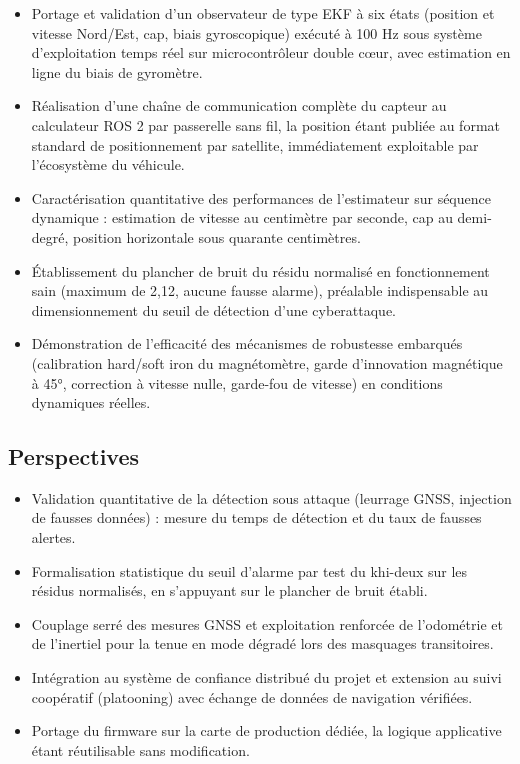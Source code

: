 \documentclass[11pt,a4paper]{article}
\begin{document}
\begin{itemize}
\item Portage et validation d’un observateur de type EKF à six états (position et vitesse Nord/Est, cap, biais gyroscopique) exécuté à 100 Hz sous système d’exploitation temps réel sur microcontrôleur double cœur, avec estimation en ligne du biais de gyromètre.
\item Réalisation d’une chaîne de communication complète du capteur au calculateur ROS 2 par passerelle sans fil, la position étant publiée au format standard de positionnement par satellite, immédiatement exploitable par l’écosystème du véhicule.
\item Caractérisation quantitative des performances de l’estimateur sur séquence dynamique : estimation de vitesse au centimètre par seconde, cap au demi-degré, position horizontale sous quarante centimètres.
\item Établissement du plancher de bruit du résidu normalisé en fonctionnement sain (maximum de 2,12, aucune fausse alarme), préalable indispensable au dimensionnement du seuil de détection d’une cyberattaque.
\item Démonstration de l’efficacité des mécanismes de robustesse embarqués (calibration hard/soft iron du magnétomètre, garde d’innovation magnétique à 45°, correction à vitesse nulle, garde-fou de vitesse) en conditions dynamiques réelles.
\end{itemize}

\subsection{Perspectives}

\begin{itemize}
\item Validation quantitative de la détection sous attaque (leurrage GNSS, injection de fausses données) : mesure du temps de détection et du taux de fausses alertes.
\item Formalisation statistique du seuil d’alarme par test du khi-deux sur les résidus normalisés, en s’appuyant sur le plancher de bruit établi.
\item Couplage serré des mesures GNSS et exploitation renforcée de l’odométrie et de l’inertiel pour la tenue en mode dégradé lors des masquages transitoires.
\item Intégration au système de confiance distribué du projet et extension au suivi coopératif (platooning) avec échange de données de navigation vérifiées.
\item Portage du firmware sur la carte de production dédiée, la logique applicative étant réutilisable sans modification.
\end{itemize}
\end{document}
